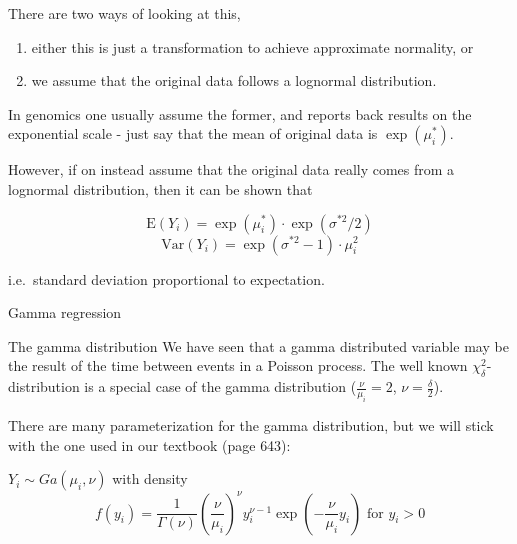 \documentclass[
  ignorenonframetext,
]{beamer}
\providecommand{\tightlist}{%
  \setlength{\itemsep}{0pt}\setlength{\parskip}{0pt}}
\begin{document}
\begin{frame}
There are two ways of looking at this,

\begin{enumerate}
\tightlist
\item
  either this is just a transformation to achieve approximate normality,
  or
\item
  we assume that the original data follows a lognormal distribution.
\end{enumerate}

In genomics one usually assume the former, and reports back results on
the exponential scale - just say that the mean of original data is
\(\exp(\mu^{*}_i)\).

However, if on instead assume that the original data really comes from a
lognormal distribution, then it can be shown that

\[\text{E}(Y_i)=\exp(\mu^{*}_i) \cdot \exp(\sigma^{*2}/2)\]
\[\text{Var}(Y_i) =\exp(\sigma^{*2} -1)\cdot \mu_i^2\]

i.e.~standard deviation proportional to expectation.
\end{frame}

\begin{frame}{Gamma regression}
\protect\hypertarget{gamma-regression}{}
\begin{block}{The gamma distribution}
\protect\hypertarget{the-gamma-distribution}{}
We have seen that a gamma distributed variable may be the result of the
time between events in a Poisson process. The well known
\(\chi^2_{\delta}\)-distribution is a special case of the gamma
distribution (\(\frac{\nu}{\mu_i}=2\), \(\nu=\frac{\delta}{2}\)).

There are many parameterization for the gamma distribution, but we will
stick with the one used in our textbook (page 643):

\(Y_i \sim Ga(\mu_i,\nu)\) with density
\[ f(y_i)=\frac{1}{\Gamma(\nu)} (\frac{\nu}{\mu_i})^{\nu} y_i^{\nu-1}\exp(-\frac{\nu}{\mu_i}y_i) \text{ for }y_i>0\]
\end{block}
\end{frame}
\end{document}
